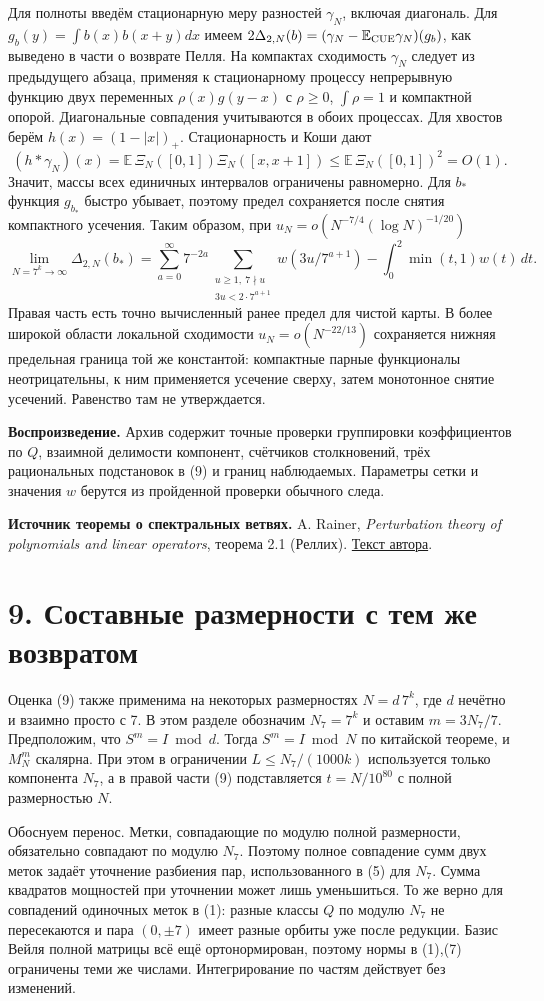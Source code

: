 \documentclass[11pt,a4paper]{article}
\newcommand{\EE}{\mathbb E}
\newcommand{\sect}[1]{\section*{\sffamily\color{ink}#1}}
\begin{document}
Для полноты введём стационарную меру разностей $\gamma_N$, включая диагональ. Для $g_b(y)=\int b(x)b(x+y)dx$ имеем $2\Delta_{2,N}(b)=(\gamma_N-\EE_{\rm CUE}\gamma_N)(g_b)$, как выведено в части о возврате Пелля. На компактах сходимость $\gamma_N$ следует из предыдущего абзаца, применяя к стационарному процессу непрерывную функцию двух переменных $\rho(x)g(y-x)$ с $\rho\ge0$, $\int\rho=1$ и компактной опорой. Диагональные совпадения учитываются в обоих процессах. Для хвостов берём $h(x)=(1-|x|)_+$. Стационарность и Коши дают
\[
             (h*\gamma_N)(x)
                  =\EE\,\Xi_N([0,1])\Xi_N([x,x+1])
                  \le \EE\,\Xi_N([0,1])^2=O(1).
\]
Значит, массы всех единичных интервалов ограничены равномерно. Для $b_*$ функция $g_{b_*}$ быстро убывает, поэтому предел сохраняется после снятия компактного усечения. Таким образом, при $u_N=o(N^{-7/4}(\log N)^{-1/20})$
\[
 \lim_{N=7^k\to\infty}\Delta_{2,N}(b_*)=
     \sum_{a=0}^{\infty}7^{-2a}\!
          \sum_{\substack{u\ge1,\ 7\nmid u\\3u<2\cdot7^{a+1}}}
             w(3u/7^{a+1})-\int_0^2\min(t,1)w(t)\,dt .
\]
Правая часть есть точно вычисленный ранее предел для чистой карты. В более широкой области локальной сходимости $u_N=o(N^{-22/13})$ сохраняется нижняя предельная граница той же константой: компактные парные функционалы неотрицательны, к ним применяется усечение сверху, затем монотонное снятие усечений. Равенство там не утверждается.

\textbf{Воспроизведение.} Архив содержит точные проверки группировки коэффициентов по $Q$, взаимной делимости компонент, счётчиков столкновений, трёх рациональных подстановок в (9) и границ наблюдаемых. Параметры сетки и значения $w$ берутся из пройденной проверки обычного следа.

\textbf{Источник теоремы о спектральных ветвях.} A. Rainer, \emph{Perturbation theory of polynomials and linear operators}, теорема 2.1 (Реллих). \href{https://www.mat.univie.ac.at/~armin/publ/handbook_paper.pdf}{Текст автора}.
\newpage
\sect{9. Составные размерности с тем же возвратом}
Оценка (9) также применима на некоторых размерностях $N=d\,7^k$, где $d$ нечётно и взаимно просто с 7. В этом разделе обозначим $N_7=7^k$ и оставим $m=3N_7/7$. Предположим, что $S^m=I\bmod d$. Тогда $S^m=I\bmod N$ по китайской теореме, и $M_N^m$ скалярна. При этом в ограничении $L\le N_7/(1000k)$ используется только компонента $N_7$, а в правой части (9) подставляется $t=N/10^{80}$ с полной размерностью $N$.

Обоснуем перенос. Метки, совпадающие по модулю полной размерности, обязательно совпадают по модулю $N_7$. Поэтому полное совпадение сумм двух меток задаёт уточнение разбиения пар, использованного в (5) для $N_7$. Сумма квадратов мощностей при уточнении может лишь уменьшиться. То же верно для совпадений одиночных меток в (1): разные классы $Q$ по модулю $N_7$ не пересекаются и пара $(0,\pm7)$ имеет разные орбиты уже после редукции. Базис Вейля полной матрицы всё ещё ортонормирован, поэтому нормы в (1),(7) ограничены теми же числами. Интегрирование по частям действует без изменений.
\end{document}
